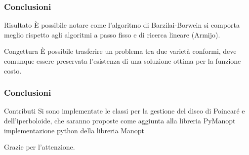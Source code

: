 \documentclass{beamer}
\begin{document}
\begin{frame}
\frametitle{Conclusioni}
\begin{beamerboxesrounded}{Risultato}
\`E possibile notare come l’algoritmo di \alert{Barzilai-Borwein si comporta meglio} rispetto agli algoritmi a passo fisso e di ricerca lineare (Armijo).
\end{beamerboxesrounded}
\bigskip
\begin{beamerboxesrounded}{Congettura}
\`E possibile trasferire un problema tra due varietà  conformi, deve comunque essere preservata l’esistenza di una soluzione ottima per la funzione costo.
\end{beamerboxesrounded}
\end{frame}

\begin{frame}
\frametitle{Conclusioni}
\begin{beamerboxesrounded}{Contributi}
Si sono implementate le classi per la gestione del disco di Poincaré e dell'iperboloide, che saranno proposte come aggiunta alla libreria \alert{PyManopt} implementazione python della libreria \alert{Manopt} 
\end{beamerboxesrounded}
\end{frame}

\begin{frame}
\begin{center}
Grazie per l'attenzione.
\end{center}
\end{frame}
\end{document}
